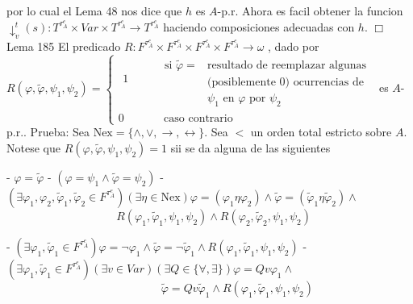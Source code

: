 por lo cual el Lema 48 nos dice que \(h\) es \(A\)-p.r. Ahora es facil obtener la funcion \(\downarrow _{v}^{t}(s):T^{\tau _{A}^{e}}\times Var\times T^{\tau _{A}^{e}}\rightarrow T^{\tau _{A}^{e}}\) haciendo composiciones adecuadas con \(h\). \(\Box\)
Lema 185 El predicado \(R:F^{\tau _{A}^{e}}\times F^{\tau _{A}^{e}}\times F^{\tau _{A}^{e}}\times F^{\tau _{A}^{e}}\rightarrow \omega \) , dado por
\(\displaystyle R(\varphi ,\tilde{\varphi},\psi _{1},\psi _{2})=\left\{ \begin{array}{cccl} \begin{array}{c} 1 \\ \; \\ \ \end{array} & & & \begin{array}{cl} \text{si }\tilde{\varphi}= & \text{resultado de reemplazar algunas} \\ & \text{(posiblemente }0\text{) ocurrencias de} \\ & \psi _{1}\text{ en }\varphi \text{ por }\psi _{2} \end{array} \\ 0 & & & \text{ caso contrario} \end{array} \right. \)
es \(A\)-p.r..
Prueba: Sea \(\mathrm{Nex}=\{\wedge ,\vee ,\rightarrow ,\leftrightarrow \}\). Sea \(< \) un orden total estricto sobre \(A\). Notese que \(R(\varphi ,\tilde{\varphi} ,\psi _{1},\psi _{2})=1\) sii se da alguna de las siguientes

- \(\varphi =\tilde{\varphi}\)
- \((\varphi =\psi _{1}\wedge \tilde{\varphi}=\psi _{2})\)
- \((\exists \varphi _{1},\varphi _{2},\tilde{\varphi}_{1},\tilde{ \varphi}_{2}\in F^{\tau _{A}^{e}})(\exists \eta \in \mathrm{Nex})\varphi =(\varphi _{1}\eta \varphi _{2})\wedge \tilde{\varphi}=(\tilde{\varphi} _{1}\eta \tilde{\varphi}_{2})\wedge \)
\(\;\;\;\;\;\;\;\;\;\;\;\;\;\;\;\;\;\;\;\;\;\;\;\;\;\;\;\;\;\;\;\;\;\;\;R( \varphi _{1},\tilde{\varphi}_{1},\psi _{1},\psi _{2})\wedge R(\varphi _{2}, \tilde{\varphi}_{2},\psi _{1},\psi _{2})\)

- \((\exists \varphi _{1},\tilde{\varphi}_{1}\in F^{\tau _{A}^{e}})\varphi =\lnot \varphi _{1}\wedge \tilde{\varphi}=\lnot \tilde{ \varphi}_{1}\wedge R(\varphi _{1},\tilde{\varphi}_{1},\psi _{1},\psi _{2})\)
- \((\exists \varphi _{1},\tilde{\varphi}_{1}\in F^{\tau _{A}^{e}})(\exists v\in Var)(\exists Q\in \{\forall ,\exists \})\varphi =Qv\varphi _{1}\wedge \)
\(\ \ \ \ \ \ \ \ \ \ \ \ \ \ \ \ \ \ \ \ \ \ \ \ \ \ \ \ \ \ \ \ \ \ \ \ \ \ \ \ \ \ \ \ \ \ \ \ \ \ \ \ \ \ \ \ \ \ \ \ \ \ \tilde{\varphi}=Qv\tilde{ \varphi}_{1}\wedge R(\varphi _{1},\tilde{\varphi}_{1},\psi _{1},\psi _{2})\)

